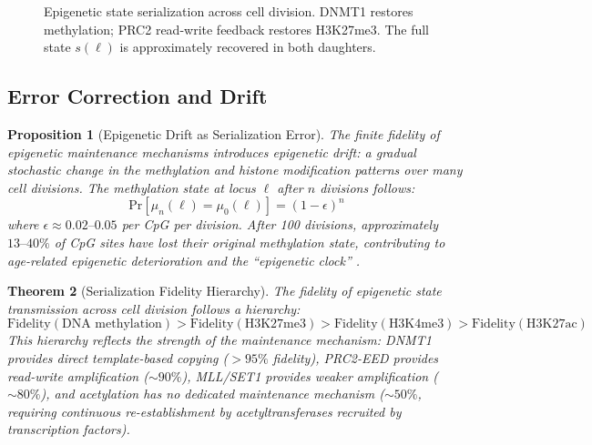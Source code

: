 \documentclass[12pt,a4paper]{article}
\newtheorem{theorem}{Theorem}[section]
\newtheorem{proposition}[theorem]{Proposition}
\begin{document}
\begin{figure}[H]
\centering
{}
\caption{Epigenetic state serialization across cell division. DNMT1 restores methylation; PRC2 read-write feedback restores H3K27me3. The full state $s(\ell)$ is approximately recovered in both daughters.}
\label{fig:serialization}
\end{figure}

\subsection{Error Correction and Drift}

\begin{proposition}[Epigenetic Drift as Serialization Error]
\label{prop:drift}
The finite fidelity of epigenetic maintenance mechanisms introduces \emph{epigenetic drift}: a gradual stochastic change in the methylation and histone modification patterns over many cell divisions. The methylation state at locus $\ell$ after $n$ divisions follows:
\[
    \mathrm{Pr}[\mu_n(\ell) = \mu_0(\ell)] = (1 - \epsilon)^n
\]
where $\epsilon \approx 0.02\text{--}0.05$ per CpG per division. After 100 divisions, approximately $13\text{--}40\%$ of CpG sites have lost their original methylation state, contributing to age-related epigenetic deterioration and the ``epigenetic clock'' \cite{horvath2013}.
\end{proposition}

\begin{theorem}[Serialization Fidelity Hierarchy]
\label{thm:fidelity}
The fidelity of epigenetic state transmission across cell division follows a hierarchy:
\[
    \mathrm{Fidelity}(\textrm{DNA methylation}) > \mathrm{Fidelity}(\textrm{H3K27me3}) > \mathrm{Fidelity}(\textrm{H3K4me3}) > \mathrm{Fidelity}(\textrm{H3K27ac})
\]
This hierarchy reflects the strength of the maintenance mechanism: DNMT1 provides direct template-based copying ($>95\%$ fidelity), PRC2-EED provides read-write amplification ($\sim 90\%$), MLL/SET1 provides weaker amplification ($\sim 80\%$), and acetylation has no dedicated maintenance mechanism ($\sim 50\%$, requiring continuous re-establishment by acetyltransferases recruited by transcription factors).
\end{theorem}
\end{document}
